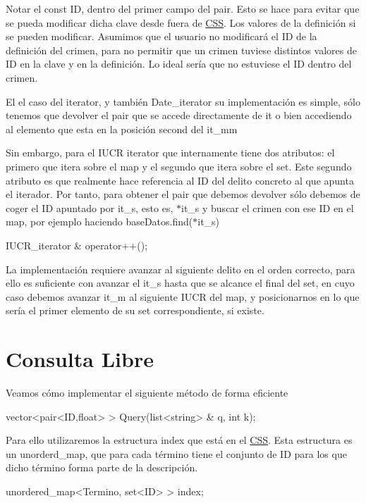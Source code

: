 Notar el const I\+D, dentro del primer campo del pair. Esto se hace para evitar que se pueda modificar dicha clave desde fuera de \hyperlink{classCSS}{C\+S\+S}. Los valores de la definición si se pueden modificar. Asumimos que el usuario no modificará el I\+D de la definición del crimen, para no permitir que un crimen tuviese distintos valores de I\+D en la clave y en la definición. Lo ideal sería que no estuviese el I\+D dentro del crimen.

El el caso del iterator, y también Date\+\_\+iterator su implementación es simple, sólo tenemos que devolver el pair que se accede directamente de it o bien accediendo al elemento que esta en la posición second del it\+\_\+mm

Sin embargo, para el I\+U\+C\+R iterator que internamente tiene dos atributos\+: el primero que itera sobre el map y el segundo que itera sobre el set. Este segundo atributo es que realmente hace referencia al I\+D del delito concreto al que apunta el iterador. Por tanto, para obtener el pair que debemos devolver sólo debemos de coger el I\+D apuntado por it\+\_\+s, esto es, $\ast$it\+\_\+s y buscar el crimen con ese I\+D en el map, por ejemplo haciendo base\+Datos.\+find($\ast$it\+\_\+s)

\begin{DoxyItemize}
\item I\+U\+C\+R\+\_\+iterator \& operator++();\end{DoxyItemize}
La implementación requiere avanzar al siguiente delito en el orden correcto, para ello es suficiente con avanzar el it\+\_\+s hasta que se alcance el final del set, en cuyo caso debemos avanzar it\+\_\+m al siguiente I\+U\+C\+R del map, y posicionarnos en lo que sería el primer elemento de su set correspondiente, si existe.\hypertarget{index_consulta}{}\section{Consulta Libre}\label{index_consulta}
Veamos cómo implementar el siguiente método de forma eficiente 
\begin{DoxyCode}
vector<pair<ID,float> > Query(list<string> & q, \textcolor{keywordtype}{int} k);   
\end{DoxyCode}


Para ello utilizaremos la estructura index que está en el \hyperlink{classCSS}{C\+S\+S}. Esta estructura es un unorderd\+\_\+map, que para cada término tiene el conjunto de I\+D para los que dicho término forma parte de la descripción. 
\begin{DoxyCode}
unordered\_map<Termino, set<ID> > index;
\end{DoxyCode}


